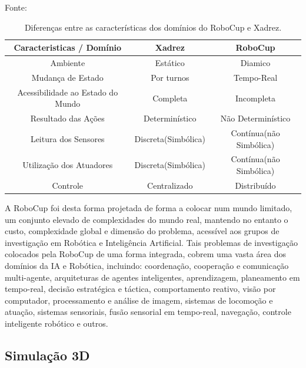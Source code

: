 \begin{table}[h]

\centering

\caption{Diferenças entre as características dos domínios do RoboCup e Xadrez.} Fonte: \cite{reisTese} 

  \begin{tabular}{|c|c|c|}

    \hline
    \hline
    Caracteristicas / Domínio & Xadrez & RoboCup \\
    \hline
    Ambiente & Estático & Diamico \\
    \hline
    Mudança de Estado & Por turnos & Tempo-Real \\
    \hline
    Acessibilidade ao Estado do Mundo & Completa & Incompleta \\
    \hline
    Resultado das Ações & Determinístico & Não Determinístico \\
    \hline
    Leitura dos Sensores & Discreta(Simbólica) & Contínua(não Simbólica) \\
    \hline
    Utilização dos Atuadores & Discreta(Simbólica) & Contínua(não Simbólica) \\
    \hline
    Controle & Centralizado & Distribuído \\
    \hline
    \hline
  \end{tabular}

  \label{tab:xadrobocup}
\end{table}

A RoboCup foi desta forma projetada de forma a colocar num mundo limitado, um conjunto elevado de complexidades do mundo real, 
mantendo no entanto o custo, complexidade global e dimensão do problema, acessível aos grupos de investigação em Robótica e 
Inteligência Artificial. Tais problemas de investigação colocados pela RoboCup de uma forma integrada, cobrem uma vasta área dos 
domínios da IA e Robótica, incluindo: coordenação, cooperação e comunicação multi-agente, arquiteturas de agentes inteligentes, 
aprendizagem, planeamento em tempo-real, decisão estratégica e táctica, comportamento reativo, visão por computador, processamento
e análise de imagem, sistemas de locomoção e atuação, sistemas sensoriais, fusão sensorial em tempo-real, navegação, controle 
inteligente robótico e outros.

\subsection{Simulação 3D}


